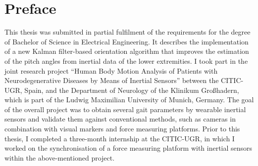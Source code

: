 
\begingroup
\let\clearpage\relax
\let\cleardoublepage\relax
\let\cleardoublepage\relax

\chapter*{Preface}
This thesis was submitted in partial fulfilment of the requirements for the degree of Bachelor of Science in Electrical Engineering. It describes the implementation of a new Kalman filter-based orientation algorithm that improves the estimation of the pitch angles from inertial data of the lower extremities. I took part in the joint research project ``Human Body Motion Analysis of Patients with Neurodegenerative Diseases by Means of Inertial Sensors'' between the CITIC-UGR, Spain, and the Department of Neurology of the Klinikum Großhadern, which is part of the Ludwig Maximilian University of Munich, Germany. The goal of the overall project was to obtain several gait parameters by wearable inertial sensors and validate them against conventional methods, such as cameras in combination with visual markers and force measuring platforms. Prior to this thesis, I completed a three-month internship at the CITIC-UGR, in which I worked on the synchronisation of a force measuring platform with inertial sensors within the above-mentioned project.

\vfill

\endgroup			

\vfill